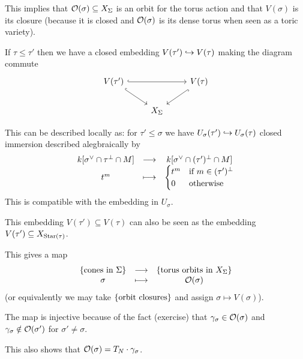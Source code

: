 \begin{remark}
This implies that $\mathcal{O}(\sigma)\subseteq X_\Sigma$ is an orbit for the torus action and that $V(\sigma)$ is its closure (because it is closed and $\mathcal{O}(\sigma)$ is its dense torus when seen as a toric variety).
\end{remark}


If $\tau\leq \tau'$ then we have a closed embedding $V(\tau')\hookrightarrow V(\tau)$ making the diagram commute
\[\begin{tikzcd}
	{V(\tau')} && {V(\tau)} \\
	& {X_{\Sigma}}
	\arrow[hook, from=1-1, to=1-3]
	\arrow[hook, from=1-1, to=2-2]
	\arrow[hook, from=1-3, to=2-2]
\end{tikzcd}\]

This can be described locally as: for $\tau'\leq \sigma$ we have $U_\sigma(\tau')\hookrightarrow U_\sigma(\tau)$ closed immersion described alegbraically by
\[\begin{array}{ccc} {k[\sigma^\vee\cap \tau^\perp\cap M]} & \longrightarrow & {k[\sigma^\vee\cap (\tau')^\perp\cap M]}\\ {t^m} & \longmapsto & {\begin{cases}
	t^m &\text{if }m\in (\tau')^\perp\\
	0 &\text{otherwise}
\end{cases}} \end{array}\]
This is compatible with the embedding in $U_\sigma$.


\begin{remark}
This embedding $V(\tau')\subseteq V(\tau)$ can also be seen as the embedding $V(\tau')\subseteq X_{\operatorname{Star}(\tau)}$.
\end{remark}



This gives a map
\[\begin{array}{ccc} {\left\{{\text{cones in }\Sigma}\right\}} & \longrightarrow & {\left\{{\text{torus orbits in }X_{\Sigma}}\right\}}\\ {\sigma} & \longmapsto & {\mathcal{O}(\sigma)} \end{array}\]
(or equivalently we may take $\left\{{\text{orbit closures}}\right\}$ and assign $\sigma\mapsto V(\sigma)$).

\begin{remark}
The map is injective because of the fact (exercise) that $\gamma_\sigma\in \mathcal{O}(\sigma)$ and $\gamma_\sigma\notin \mathcal{O}(\sigma')$ for $\sigma'\neq \sigma$. 

This also shows that $\mathcal{O}(\sigma)=T_N\cdot \gamma_\sigma$.
\end{remark}


